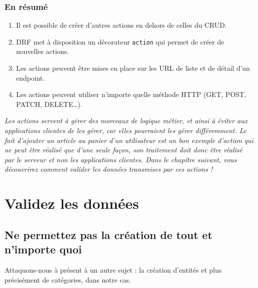 \documentclass[a4paper]{article}
\begin{document}
\subsubsection*{En résumé}
\begin{enumerate}
\item Il est possible de créer d’autres actions en dehors de celles du CRUD.
\item DRF met à disposition un décorateur {\tt action}  qui permet de créer de nouvelles actions.
\item Les actions peuvent être mises en place sur les URL de liste et de détail d’un endpoint.
\item Les actions peuvent utiliser n’importe quelle méthode HTTP (GET, POST, PATCH, DELETE…).
\end{enumerate}
{\em Les actions servent à gérer des morceaux de logique métier, et ainsi à éviter aux applications clientes de les gérer, car elles pourraient les gérer différemment. Le fait d’ajouter un article au panier d’un utilisateur est un bon exemple d’action qui ne peut être réalisé que d’une seule façon, son traitement doit donc être réalisé par le serveur et non les applications clientes. Dans le chapitre suivant, vous découvrirez comment valider les données transmises par ces actions !}

\section{Validez les données}
\subsection{Ne permettez pas la création de tout et n’importe quoi}
Attaquons-nous à présent à un autre sujet : {\color{monOrange}la création d’entités} et plus précisément de catégories, dans notre cas.
\end{document}
